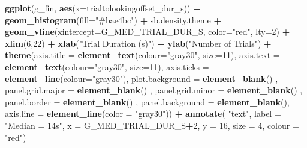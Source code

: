 \documentclass[
  doc,floatsintext]{apa6}
\newenvironment{Shaded}{\begin{snugshade}}{\end{snugshade}}
\newcommand{\AttributeTok}[1]{\textcolor[rgb]{0.13,0.29,0.53}{#1}}
\newcommand{\DecValTok}[1]{\textcolor[rgb]{0.00,0.00,0.81}{#1}}
\newcommand{\FunctionTok}[1]{\textcolor[rgb]{0.13,0.29,0.53}{\textbf{#1}}}
\newcommand{\NormalTok}[1]{#1}
\newcommand{\SpecialCharTok}[1]{\textcolor[rgb]{0.81,0.36,0.00}{\textbf{#1}}}
\newcommand{\StringTok}[1]{\textcolor[rgb]{0.31,0.60,0.02}{#1}}
\begin{document}
\begin{Shaded}
\begin{Highlighting}[]
\FunctionTok{ggplot}\NormalTok{(g\_fin, }\FunctionTok{aes}\NormalTok{(}\AttributeTok{x=}\NormalTok{trialtolookingoffset\_dur\_s)) }\SpecialCharTok{+}
  \FunctionTok{geom\_histogram}\NormalTok{(}\AttributeTok{fill=}\StringTok{"\#bae4bc"}\NormalTok{) }\SpecialCharTok{+}
\NormalTok{  sb.density.theme }\SpecialCharTok{+}
  \FunctionTok{geom\_vline}\NormalTok{(}\AttributeTok{xintercept=}\NormalTok{G\_MED\_TRIAL\_DUR\_S, }\AttributeTok{color=}\StringTok{"red"}\NormalTok{, }\AttributeTok{lty=}\DecValTok{2}\NormalTok{) }\SpecialCharTok{+}
  \FunctionTok{xlim}\NormalTok{(}\DecValTok{6}\NormalTok{,}\DecValTok{22}\NormalTok{) }\SpecialCharTok{+}
  \FunctionTok{xlab}\NormalTok{(}\StringTok{"Trial Duration (s)"}\NormalTok{) }\SpecialCharTok{+}
  \FunctionTok{ylab}\NormalTok{(}\StringTok{"Number of Trials"}\NormalTok{) }\SpecialCharTok{+} 
  \FunctionTok{theme}\NormalTok{(}\AttributeTok{axis.title =} \FunctionTok{element\_text}\NormalTok{(}\AttributeTok{colour=}\StringTok{"gray30"}\NormalTok{, }\AttributeTok{size=}\DecValTok{11}\NormalTok{),}
        \AttributeTok{axis.text =} \FunctionTok{element\_text}\NormalTok{(}\AttributeTok{colour=}\StringTok{"gray30"}\NormalTok{, }\AttributeTok{size=}\DecValTok{11}\NormalTok{),}
        \AttributeTok{axis.ticks =} \FunctionTok{element\_line}\NormalTok{(}\AttributeTok{colour=}\StringTok{"gray30"}\NormalTok{),}
        \AttributeTok{plot.background =} \FunctionTok{element\_blank}\NormalTok{() ,}
        \AttributeTok{panel.grid.major =} \FunctionTok{element\_blank}\NormalTok{() ,}
        \AttributeTok{panel.grid.minor =} \FunctionTok{element\_blank}\NormalTok{() ,}
        \AttributeTok{panel.border =} \FunctionTok{element\_blank}\NormalTok{() ,}
        \AttributeTok{panel.background =} \FunctionTok{element\_blank}\NormalTok{(),}
        \AttributeTok{axis.line =} \FunctionTok{element\_line}\NormalTok{(}\AttributeTok{color =} \StringTok{"gray30"}\NormalTok{)) }\SpecialCharTok{+}
  \FunctionTok{annotate}\NormalTok{(}
    \StringTok{"text"}\NormalTok{, }\AttributeTok{label =} \StringTok{"Median = 14s"}\NormalTok{,}
    \AttributeTok{x =}\NormalTok{ G\_MED\_TRIAL\_DUR\_S}\SpecialCharTok{+}\DecValTok{2}\NormalTok{, }\AttributeTok{y =} \DecValTok{16}\NormalTok{, }\AttributeTok{size =} \DecValTok{4}\NormalTok{, }\AttributeTok{colour =} \StringTok{"red"}\NormalTok{)}
\end{Highlighting}
\end{Shaded}
\end{document}
